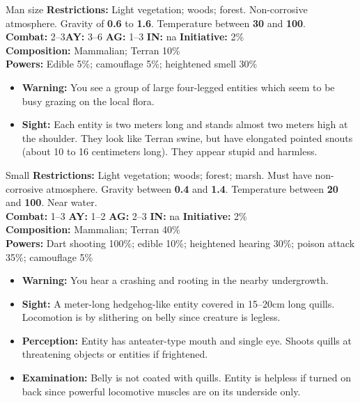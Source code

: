 \pagebreak

  \begin{creature}{Man size}
    \label{sec:creatures-1}
    \textbf{Restrictions:} Light vegetation; woods; forest.  Non-corrosive
    atmosphere.  Gravity of \textbf{0.6} to \textbf{1.6}. Temperature
    between \textbf{30\textdegree} and \textbf{100\textdegree}. \\ 
    \textbf{Combat:} 2--3\hspace{2ex}\textbf{AY:} 3--6 \textbf{AG:} 1--3 \textbf{IN:}
    na \textbf{Initiative:} 2\%  \\
    \textbf{Composition:} Mammalian; Terran 10\% \\
    \textbf{Powers:} Edible 5\%; camouflage 5\%; heightened smell 30\% \\
    \begin{itemize}
    \item \textbf{Warning:} You see a group of large four-legged entities
      which seem to be busy grazing on the local flora.  \\
    \item \textbf{Sight:} Each entity is two meters long and stands almost
      two meters high at the shoulder. They look like Terran swine, but
      have elongated pointed snouts (about 10 to 16 centimeters long).
      They appear stupid and harmless.
    \end{itemize}
  \end{creature}

\hrulefill

  \begin{creature}{Small}
    \textbf{Restrictions:} Light vegetation; woods; forest; marsh. Must
    have non-corrosive atmosphere. Gravity between \textbf{0.4} and \textbf{1.4}.
    Temperature
    between \textbf{20\textdegree} and \textbf{100\textdegree}. Near water. \\
    \textbf{Combat:} 1--3 \textbf{AY:} 1--2 \textbf{AG:} 2--3 \textbf{IN:} na \textbf{Initiative:} 2\% \\
    \textbf{Composition:} Mammalian; Terran 40\% \\
    \textbf{Powers:} Dart shooting 100\%; edible 10\%; heightened hearing
    30\%; poison attack 35\%; camouflage 5\%
    \begin{itemize}
    \item \textbf{Warning:} You hear a crashing and rooting in the nearby
      undergrowth.
    \item\textbf{Sight:} A meter-long hedgehog-like entity covered in
      15--20cm long quills. Locomotion is by slithering on belly since
      creature is legless.
    \item\textbf{Perception:} Entity has anteater-type mouth and single
      eye. Shoots quills at threatening objects or entities if frightened.
    \item\textbf{Examination:} Belly is not coated with quills. Entity is
      helpless if turned on back since powerful locomotive muscles are on
      its underside only.
    \end{itemize}
  \end{creature}

